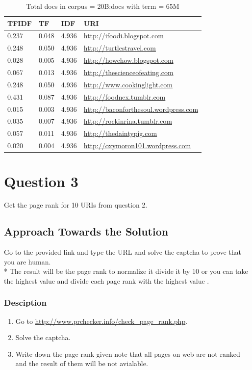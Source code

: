 \documentclass[12pt]{article}
\begin{document}
\begin{center}
\begin{table}
\small
\begin{tabular}{ | p{3.0cm} | p{3.0cm} |p{3.0cm} | p{8.0cm} | }\hline
\textbf{TFIDF} & \textbf{TF} & \textbf{IDF} & \textbf{URI} \\\hline
0.237 & 0.048 & 4.936 & \url{http://ifoodi.blogspot.com } \\\hline
0.248 & 0.050 & 4.936 & \url{ http://turtlestravel.com} \\\hline
0.028 & 0.005 & 4.936 & \url{ http://howchow.blogspot.com} \\\hline
0.067 & 0.013 & 4.936 & \url{ http://thescienceofeating.com} \\\hline 
0.248 & 0.050 & 4.936 & \url{ http://www.cookinglight.com} \\\hline
0.431 & 0.087 & 4.936 & \url{http://foodnex.tumblr.com} \\\hline
0.015 & 0.003 & 4.936 & \url{ http://baconforthesoul.wordpress.com} \\\hline
0.035 & 0.007 & 4.936 & \url{ http://rockinrina.tumblr.com} \\\hline
0.057 & 0.011 & 4.936 & \url{ http://thedaintypig.com} \\\hline
0.020 & 0.004 & 4.936 & \url{ http://oxymoron101.wordpress.com} \\\hline
\end{tabular}
\caption{Total docs in corpus = 20B:docs with term = 65M}
\end{table}
\end{center}
\newpage
\section{Question 3}
Get the page rank for 10 URIs from question 2.
\subsection{Approach Towards the Solution}
Go to the provided link and type the URL and solve the captcha to prove that you are human.\\*
The result will be the page rank to normalize it divide it by 10 or you can take the highest value and divide each page rank with the highest value .

\subsubsection{Desciption}
\begin{enumerate}
	\item Go to \url {http://www.prchecker.info/check_page_rank.php}.
	\item Solve the captcha.
	\item Write down the page rank given note that all pages on web are not ranked and the result of them will be not avialable.
\end{enumerate}
\end{document}
